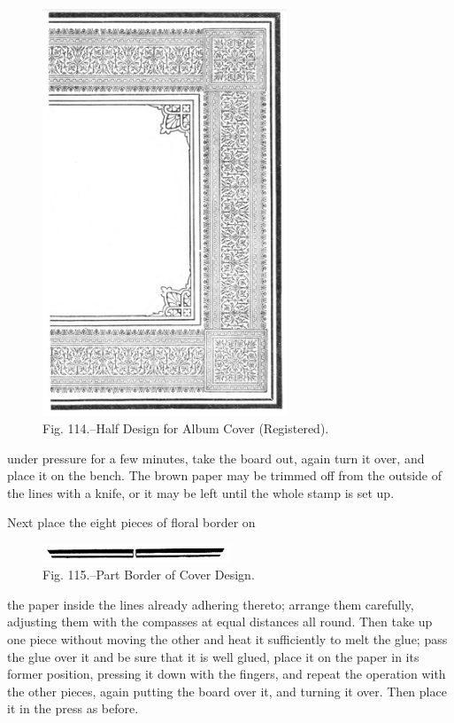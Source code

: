 \documentclass[twoside]{book}
\begin{document}
	\begin{figure}[h]
		\centering
		\includegraphics[width=0.65\textwidth]{Figures/_114.png}
		\caption*{Fig. 114.--Half Design for Album Cover (Registered).}
	\end{figure}
	\vspace*{\fill}
\pagebreak
under pressure for a few minutes, take the board
out, again turn it over, and place it on the bench.
The brown paper may be trimmed off from the outside
of the lines with a knife, or it may be left until
the whole stamp is set up.

Next place the eight pieces of floral border on	
	\begin{figure}[h]
		\centering
		\includegraphics[width=0.5\textwidth]{Figures/_115.png}
		\caption*{Fig. 115.--Part Border of Cover Design.}
	\end{figure}
the paper inside the lines already adhering thereto;
arrange them carefully, adjusting them with the
compasses at equal distances all round. Then take
up one piece without moving the other and heat it
sufficiently to melt the glue; pass the glue over it
and be sure that it is well glued, place it on the
paper in its former position, pressing it down with
the fingers, and repeat the operation with the other
pieces, again putting the board over it, and turning
it over. Then place it in the press as before.
\end{document}
